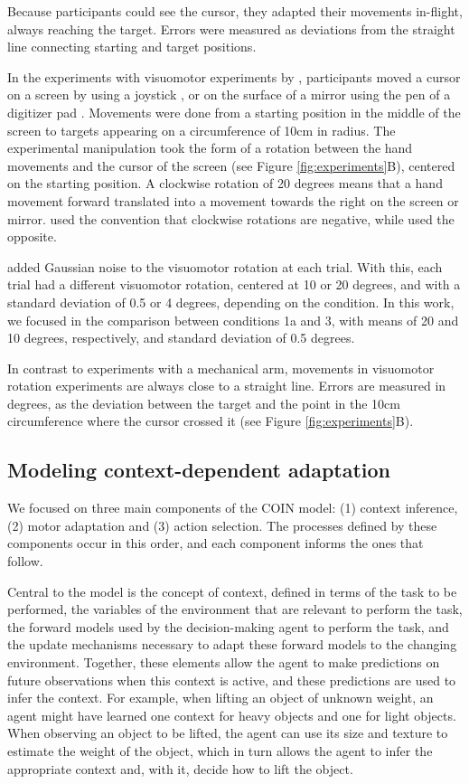 \documentclass[a4paper,doc,floatsintext,natbib]{apa6}
\def \fref #1{Figure \ref{#1}}     %
\begin{document}
Because participants could see the cursor, they adapted their movements in-flight, always reaching the target. Errors were measured as deviations from the straight line connecting starting and target positions.

In the experiments with visuomotor experiments by \cite{Kim_Neural_2015,Oh_Minimizing_2019}, participants moved a cursor on a screen by using a joystick \cite{Kim_Neural_2015}, or on the surface of a mirror using the pen of a digitizer pad \cite{Oh_Minimizing_2019}. Movements were done from a starting position in the middle of the screen to targets appearing on a circumference of 10cm in radius. The experimental manipulation took the form of a rotation between the hand movements and the cursor of the screen (see \fref{fig:experiments}B), centered on the starting position. A clockwise rotation of 20 degrees means that a hand movement forward translated into a movement towards the right on the screen or mirror. \cite{Kim_Neural_2015} used the convention that clockwise rotations are negative, while \cite{Oh_Minimizing_2019} used the opposite.

\cite{Oh_Minimizing_2019} added Gaussian noise to the visuomotor rotation at each trial. With this, each trial had a different visuomotor rotation, centered at 10 or 20 degrees, and with a standard deviation of 0.5 or 4 degrees, depending on the condition. In this work, we focused in the comparison between conditions 1a and 3, with means of 20 and 10 degrees, respectively, and standard deviation of 0.5 degrees.

In contrast to experiments with a mechanical arm, movements in visuomotor rotation experiments are always close to a straight line. Errors are measured in degrees, as the deviation between the target and the point in the 10cm circumference where the cursor crossed it (see \fref{fig:experiments}B).


\subsection{Modeling context-dependent adaptation}
We focused on three main components of the COIN model: (1) context inference, (2) motor adaptation and (3) action selection. The processes defined by these components occur in this order, and each component informs the ones that follow.

Central to the model is the concept of context, defined in terms of the task to be performed, the variables of the environment that are relevant to perform the task, the forward models used by the decision-making agent to perform the task, and the update mechanisms necessary to adapt these forward models to the changing environment. Together, these elements allow the agent to make predictions on future observations when this context is active, and these predictions are used to infer the context. For example, when lifting an object of unknown weight, an agent might have learned one context for heavy objects and one for light objects. When observing an object to be lifted, the agent can use its size and texture to estimate the weight of the object, which in turn allows the agent to infer the appropriate context and, with it, decide how to lift the object.
\end{document}
